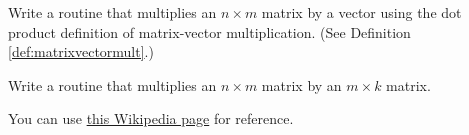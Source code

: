 \documentclass{ximera}
\begin{document}
\begin{problem}\label{prob_oct_mat3}
Write a routine that multiplies an $n\times m$ matrix by a vector using the dot product definition of matrix-vector multiplication. (See Definition \ref{def:matrixvectormult}.)
    
\end{problem}

\begin{problem}\label{prob_oct_6}
    Write a routine that multiplies an $n\times m$ matrix by an $m\times k$ matrix.  

    \begin{hint}
        You can use \href{https://en.wikipedia.org/wiki/Matrix_multiplication_algorithm}{this Wikipedia page} for reference.
    \end{hint}    
\end{problem}
\end{document}
